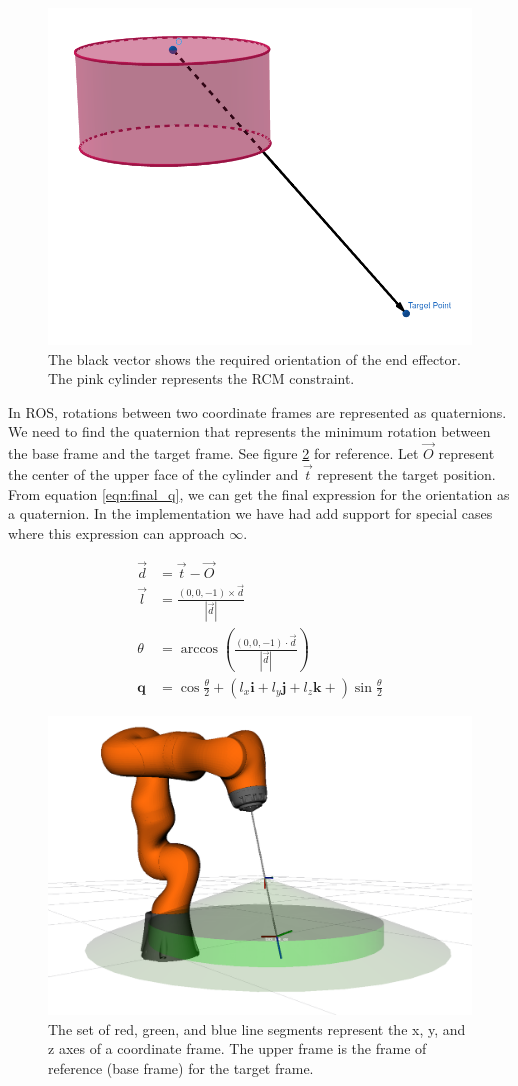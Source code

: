\documentclass[BTech]{iitmdiss}
\begin{document}
    \begin{figure}
        \centering
        \includegraphics[width=0.5 \linewidth]{./img/target_orientation}
        \caption{The black vector shows the required orientation of the end effector. The pink cylinder represents the RCM constraint.}
        \label{fig:target_orientation}
    \end{figure}


    In ROS, rotations between two coordinate frames are represented as quaternions.
    We need to find the quaternion that represents the minimum rotation between the base frame and the target frame.
    See figure \ref{fig:coordinate_frames} for reference.
    Let $\vec{O}$ represent the center of the upper face of the cylinder and $\vec{t}$ represent the target position.
    From equation \ref{eqn:final_q}, we can get the final expression for the orientation as a quaternion.
    In the implementation we have had add support for special cases where this expression can approach $\infty$.

    \begin{align}
        \vec{d} &= \vec{t} - \vec{O} \\
        \vec{l} &= \frac{(0, 0, -1) \times \vec{d}}{|\vec{d}|} \\
        \theta &= \arccos{\left(\frac{(0, 0, -1) \cdot \vec{d}}{|\vec{d}|}\right)} \\
        \mathbf{q} &= \cos{\frac{\theta}{2}} + \left(l_x \mathbf{i} + l_y \mathbf{j} + l_z \mathbf{k} + \right) \sin{\frac{\theta}{2}} \label{eqn:final_q}
    \end{align}


    \begin{figure}
        \centering
        \includegraphics[width=0.5 \linewidth]{./img/coordinate_frames}
        \caption{The set of red, green, and blue line segments represent the x, y, and z axes of a coordinate frame.
        The upper frame is the frame of reference (base frame) for the target frame.}
        \label{fig:coordinate_frames}
    \end{figure}
\end{document}
